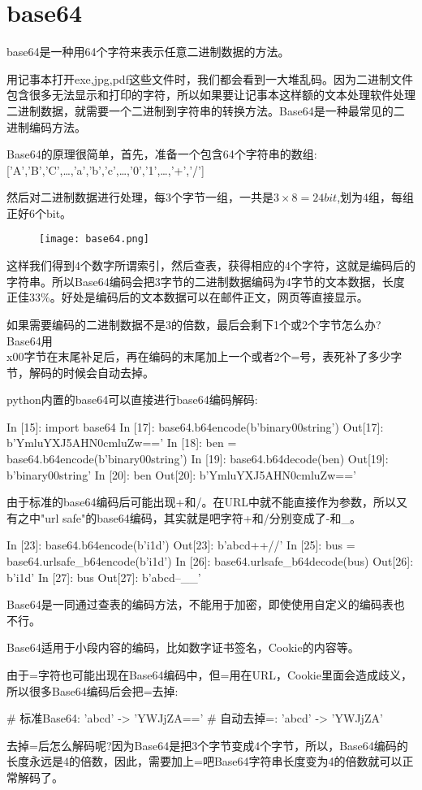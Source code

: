 \section{base64}
base64是一种用64个字符来表示任意二进制数据的方法。

用记事本打开exe,jpg,pdf这些文件时，我们都会看到一大堆乱码。因为二进制文件包含很多无法显示和打印的字符，所以如果要让记事本这样额的文本处理软件处理二进制数据，就需要一个二进制到字符串的转换方法。Base64是一种最常见的二进制编码方法。

Base64的原理很简单，首先，准备一个包含64个字符串的数组:
['A','B','C',\ldots,'a','b','c',\ldots,'0','1',\ldots,'+','/']

然后对二进制数据进行处理，每3个字节一组，一共是$3\times8=24bit$,划为4组，每组正好6个bit。
\begin{figure}[H]
	\texttt{[image: base64.png]}
\end{figure}
这样我们得到4个数字所谓索引，然后查表，获得相应的4个字符，这就是编码后的字符串。所以Base64编码会把3字节的二进制数据编码为4字节的文本数据，长度正佳33\%。好处是编码后的文本数据可以在邮件正文，网页等直接显示。

如果需要编码的二进制数据不是3的倍数，最后会剩下1个或2个字节怎么办?Base64用\\x00字节在末尾补足后，再在编码的末尾加上一个或者2个=号，表死补了多少字节，解码的时候会自动去掉。

python内置的base64可以直接进行base64编码解码:
\begin{python}
In [15]: import base64
In [17]: base64.b64encode(b'binary\x00string')
Out[17]: b'YmluYXJ5AHN0cmluZw=='
In [18]: ben = base64.b64encode(b'binary\x00string')
In [19]: base64.b64decode(ben)
Out[19]: b'binary\x00string'
In [20]: ben
Out[20]: b'YmluYXJ5AHN0cmluZw=='
\end{python}
由于标准的base64编码后可能出现+和/。在URL中就不能直接作为参数，所以又有之中"url safe"的base64编码，其实就是吧字符+和/分别变成了-和\_。
\begin{python}
In [23]: base64.b64encode(b'i\x1d\xfb\xef\xff')
Out[23]: b'abcd++//'
In [25]: bus = base64.urlsafe_b64encode(b'i\x1d\xfb\xef\xff')
In [26]: base64.urlsafe_b64decode(bus)
Out[26]: b'i\x1d\xfb\xef\xff'
In [27]: bus
Out[27]: b'abcd--__'
\end{python}

Base64是一同通过查表的编码方法，不能用于加密，即使使用自定义的编码表也不行。

Base64适用于小段内容的编码，比如数字证书签名，Cookie的内容等。

由于=字符也可能出现在Base64编码中，但=用在URL，Cookie里面会造成歧义，所以很多Base64编码后会把=去掉:
\begin{python}
# 标准Base64:
'abcd' -> 'YWJjZA=='
# 自动去掉=:
'abcd' -> 'YWJjZA'
\end{python}
去掉=后怎么解码呢?因为Base64是把3个字节变成4个字节，所以，Base64编码的长度永远是4的倍数，因此，需要加上=吧Base64字符串长度变为4的倍数就可以正常解码了。
